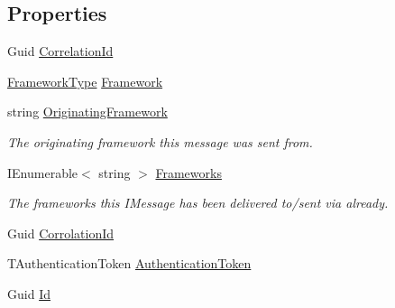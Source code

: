 \subsection*{Properties}
\begin{DoxyCompactItemize}
\item 
Guid \hyperlink{classCqrs_1_1Events_1_1DuplicateCreateCommandEvent_a7a47624fa44952499c87458257184079}{Correlation\+Id}
\item 
\hyperlink{namespaceCqrs_1_1Messages_af06a7e6cd2609043d0f2f5f3419f81e3}{Framework\+Type} \hyperlink{classCqrs_1_1Events_1_1DuplicateCreateCommandEvent_af22f0d27a301ca163314550b8991d922}{Framework}
\item 
string \hyperlink{classCqrs_1_1Events_1_1DuplicateCreateCommandEvent_a9f3b0ffe268a9be9895009b3f8894727}{Originating\+Framework}
\begin{DoxyCompactList}\small\item\em The originating framework this message was sent from. \end{DoxyCompactList}\item 
I\+Enumerable$<$ string $>$ \hyperlink{classCqrs_1_1Events_1_1DuplicateCreateCommandEvent_a9cef5da3d0b1481cd3ec9fd448d501af}{Frameworks}
\begin{DoxyCompactList}\small\item\em The frameworks this I\+Message has been delivered to/sent via already. \end{DoxyCompactList}\item 
Guid \hyperlink{classCqrs_1_1Events_1_1DuplicateCreateCommandEvent_a09f55bcafebdc68ef2440031d558da0a}{Corrolation\+Id}
\item 
T\+Authentication\+Token \hyperlink{classCqrs_1_1Events_1_1DuplicateCreateCommandEvent_ab9737d0d029bb3f4b37d2a628ea98d04}{Authentication\+Token}
\item 
Guid \hyperlink{classCqrs_1_1Events_1_1DuplicateCreateCommandEvent_a6b837c04369ac127fc34f84799c3d70a}{Id}

\end{DoxyCompactItemize}
